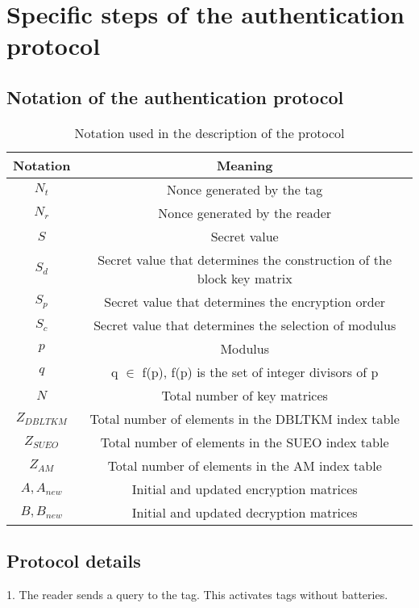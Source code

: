 \section{Specific steps of the authentication protocol}

\subsection*{Notation of the authentication protocol}
\begin{table}[H]
    \centering
    \begin{tabular}{| c | c |}
        \hline
        Notation & Meaning \\
        \hline
        $N_t$ & Nonce generated by the tag \\
        $N_r$ & Nonce generated by the reader \\
        $S$ & Secret value \\
        $S_d$ & Secret value that determines the construction of the block key matrix  \\
        $S_p$ & Secret value that determines the encryption order  \\
        $S_c$ & Secret value that determines the selection of modulus  \\
        $p$ & Modulus  \\
        $q$ & q $\in$ f(p), f(p) is the set of integer divisors of p \\
        $N$ &  Total number of key matrices \\
        $Z_{DBLTKM}$ &  Total number of elements in the DBLTKM index table \\
        $Z_{SUEO}$ & Total number of elements in the SUEO index table  \\
        $Z_{AM}$ & Total number of elements in the AM index table  \\
        $A, A_{new}$ & Initial and updated encryption matrices \\
        $B, B_{new}$ & Initial and updated decryption matrices \\
        \hline
    \end{tabular}
    \caption{Notation used in the description of the protocol}
\end{table}

\subsection*{Protocol details}

    1. The reader sends a query to the tag. This activates tags without batteries.

